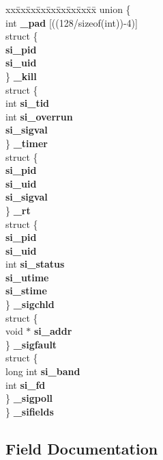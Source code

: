 \begin{DoxyCompactItemize}
\begin{tabbing}
\end{tabbing}\item 
\begin{tabbing}
xx\=xx\=xx\=xx\=xx\=xx\=xx\=xx\=xx\=\kill
union \{\\
\>int {\bf \_pad} [((128/sizeof(int))-\/4)]\\
\>struct \{\\
\> {\bf si\_pid}\\
\> {\bf si\_uid}\\
\>\} {\bf \_kill}\\
\>struct \{\\
\>\>int {\bf si\_tid}\\
\>\>int {\bf si\_overrun}\\
\> {\bf si\_sigval}\\
\>\} {\bf \_timer}\\
\>struct \{\\
\> {\bf si\_pid}\\
\> {\bf si\_uid}\\
\> {\bf si\_sigval}\\
\>\} {\bf \_rt}\\
\>struct \{\\
\> {\bf si\_pid}\\
\> {\bf si\_uid}\\
\>\>int {\bf si\_status}\\
\> {\bf si\_utime}\\
\> {\bf si\_stime}\\
\>\} {\bf \_sigchld}\\
\>struct \{\\
\>\>void $\ast$ {\bf si\_addr}\\
\>\} {\bf \_sigfault}\\
\>struct \{\\
\>\>long int {\bf si\_band}\\
\>\>int {\bf si\_fd}\\
\>\} {\bf \_sigpoll}\\
\} {\bf \_sifields}\\

\end{tabbing}\end{DoxyCompactItemize}


\subsection{Field Documentation}
